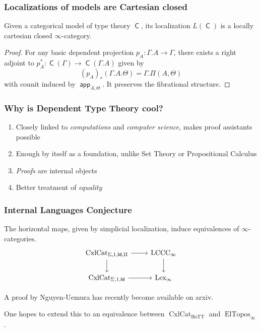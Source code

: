 \documentclass{beamer}
\DeclareMathOperator{\Id}{\mathsf{Id}}
\DeclareMathOperator{\sfC}{\mathsf{C}}
\DeclareMathOperator{\cxl}{CxlCat}
\DeclareMathOperator{\HoTT}{HoTT}
\DeclareMathOperator{\ElTopos}{ElTopos}
\DeclareMathOperator{\lexi}{Lex_\infty}
\DeclareMathOperator{\lccci}{LCCC_\infty}
\DeclareMathOperator{\app}{\mathsf{app}}
\begin{document}
\begin{frame}
  \frametitle{Localizations of models are Cartesian closed}

  \begin{thm}[Kapulkin 2015]
    Given a categorical model of type theory $\sfC$, its localization
    $L(\sfC)$ is a locally cartesian closed $\infty$-category.
  \end{thm}
  \begin{proof}
    For any basic dependent projection $p_A\colon\Gamma.A\rightarrow\Gamma$,
    there exists a right adjoint to
    $p_A^*\colon\sfC(\Gamma)\rightarrow\sfC(\Gamma.A)$ given by
    \[(p_A)_*(\Gamma.A.\Theta)=\Gamma.\Pi(A,\Theta)\]
    with counit induced by $\app_{A,\Theta}$. It preserves the fibrational
    structure.
  \end{proof}
\end{frame}

\begin{frame}
\end{frame}

\begin{frame}
  \frametitle{Why is Dependent Type Theory cool?}

  \begin{enumerate}
    \item Closely linked to \emph{computations} and \emph{computer science},
      makes proof assistants possible
    \item Enough by itself as a foundation, unlike Set Theory or Propositional
      Calculus
    \item \emph{Proofs} are internal objects
    \item Better treatment of \emph{equality}
  \end{enumerate}
\end{frame}

\begin{frame}
  \frametitle{Internal Languages Conjecture}

  \begin{conj}
    The horizontal maps, given by simplicial localization, induce
    equivalences of $\infty$-categories.
    \[\begin{tikzcd}[ampersand replacement=\&]
      {\cxl_{\Sigma,1,\Id,\Pi}} \& {\lccci} \\
      {\cxl_{\Sigma,1,\Id}} \& {\lexi}
      \arrow[from=1-1, to=2-1]
      \arrow[from=1-2, to=2-2]
      \arrow[from=2-1, to=2-2]
      \arrow[from=1-1, to=1-2]
    \end{tikzcd}\]
  \end{conj}

  A proof by Nguyen-Uemura has recently become available on arxiv.

  One hopes to extend this to an equivalence between $\cxl_{\HoTT}$ and
  $\ElTopos_\infty$.
\end{frame}
\end{document}

